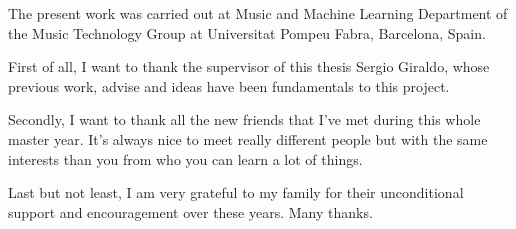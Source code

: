 
\begin{acknowledgement}
The present work was carried out at Music and Machine Learning Department of the Music Technology Group at Universitat Pompeu Fabra, Barcelona, Spain.

First of all, I want to thank the supervisor of this thesis Sergio Giraldo, whose previous work, advise and ideas have been fundamentals to this project.

Secondly, I want to thank all the new friends that I've met during this whole master year. It's always nice to meet really different people but with the same interests than you from who you can learn a lot of things.

Last  but  not  least, I  am  very grateful to  my  family for their unconditional support and encouragement over these years. Many thanks.

\newpage
\end{acknowledgement}